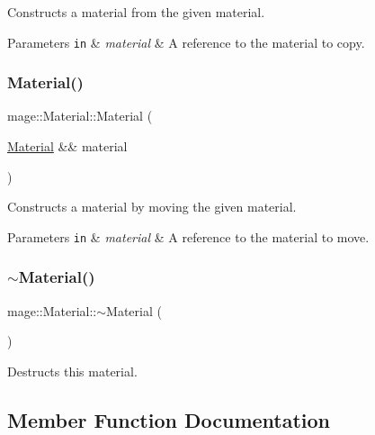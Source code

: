 Constructs a material from the given material.


\begin{DoxyParams}[1]{Parameters}
\mbox{\tt in}  & {\em material} & A reference to the material to copy. \\
\hline
\end{DoxyParams}
\hypertarget{structmage_1_1_material_a41bfbc2bfa16e3694ac443d390b804c2}{}\label{structmage_1_1_material_a41bfbc2bfa16e3694ac443d390b804c2} 
\subsubsection{\texorpdfstring{Material()}{Material()}\hspace{0.1cm}{\footnotesize\ttfamily [3/3]}}
{\footnotesize\ttfamily mage\+::\+Material\+::\+Material (\begin{DoxyParamCaption}\item[{\hyperlink{structmage_1_1_material}{Material} \&\&}]{material }\end{DoxyParamCaption})\hspace{0.3cm}{\ttfamily [default]}}

Constructs a material by moving the given material.


\begin{DoxyParams}[1]{Parameters}
\mbox{\tt in}  & {\em material} & A reference to the material to move. \\
\hline
\end{DoxyParams}
\hypertarget{structmage_1_1_material_a4ca65b7e24144ee08dd1ce8d0eda9284}{}\label{structmage_1_1_material_a4ca65b7e24144ee08dd1ce8d0eda9284} 
\subsubsection{\texorpdfstring{$\sim$\+Material()}{~Material()}}
{\footnotesize\ttfamily mage\+::\+Material\+::$\sim$\+Material (\begin{DoxyParamCaption}{ }\end{DoxyParamCaption})\hspace{0.3cm}{\ttfamily [default]}}

Destructs this material. 

\subsection{Member Function Documentation}
\hypertarget{structmage_1_1_material_ab4b92a53ee74e401c518eea299fb4e0b}{}\label{structmage_1_1_material_ab4b92a53ee74e401c518eea299fb4e0b} 
